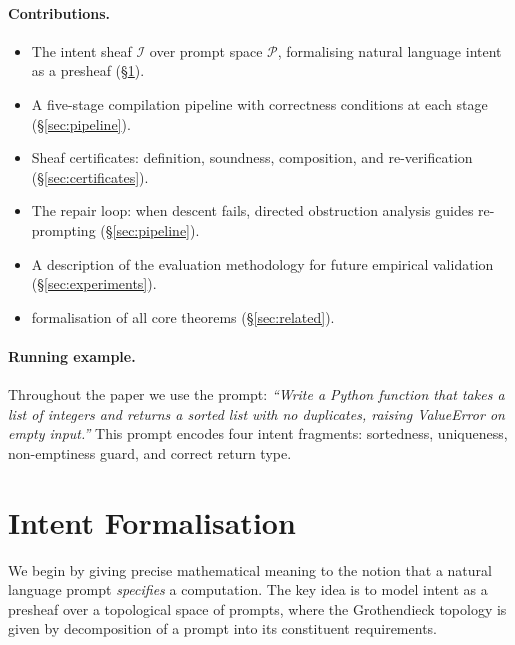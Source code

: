 \documentclass[11pt]{article}
\newcommand{\IntentSheaf}{\mathcal{I}}
\newcommand{\PromptSpace}{\mathcal{P}}
\begin{document}
\paragraph{Contributions.}
\begin{itemize}[noitemsep]
  \item The intent sheaf $\IntentSheaf$ over prompt space $\PromptSpace$,
    formalising natural language intent as a presheaf
    (§\ref{sec:intent}).
  \item A five-stage compilation pipeline with correctness conditions
    at each stage (§\ref{sec:pipeline}).
  \item Sheaf certificates: definition, soundness, composition, and
    re-verification (§\ref{sec:certificates}).
  \item The repair loop: when descent fails, directed obstruction
    analysis guides re-prompting (§\ref{sec:pipeline}).
  \item A description of the evaluation methodology for future
    empirical validation (§\ref{sec:experiments}).
  \item \LEAN{} formalisation of all core theorems
    (§\ref{sec:related}).
\end{itemize}

\paragraph{Running example.}
Throughout the paper we use the prompt: \emph{``Write a Python function
that takes a list of integers and returns a sorted list with no
duplicates, raising ValueError on empty input.''}  This prompt encodes
four intent fragments: sortedness, uniqueness, non-emptiness guard, and
correct return type.

\section{Intent Formalisation}\label{sec:intent}

We begin by giving precise mathematical meaning to the notion that a
natural language prompt \emph{specifies} a computation.  The key idea
is to model intent as a presheaf over a topological space of prompts,
where the Grothendieck topology is given by decomposition of a prompt
into its constituent requirements.

\end{document}
